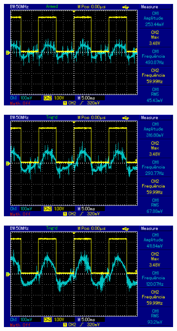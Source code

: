 \begin{figure}[!hbt]
	\centering
	\begin{subfigure}[b]{0.49\textwidth}
		\centering
		\includegraphics[width=\textwidth]{figuras/resultados_controle_corrente_0_3.png}
		\caption{}
	\end{subfigure}
	\begin{subfigure}[b]{0.49\textwidth}
		\centering
		\includegraphics[width=\textwidth]{figuras/resultados_controle_corrente_0_6.png}
		\caption{}
	\end{subfigure}
	\begin{subfigure}[b]{0.49\textwidth}
		\centering
		\includegraphics[width=\textwidth]{figuras/resultados_controle_corrente_0_9.png}

\end{subfigure}
\end{figure}
